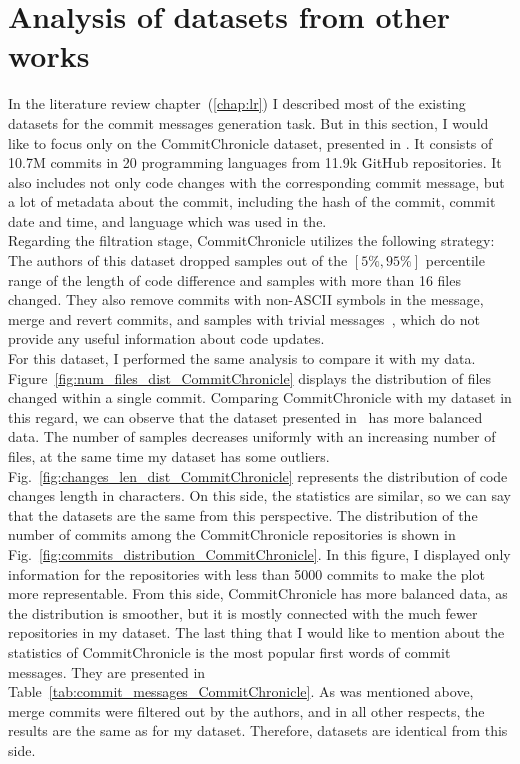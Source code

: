 \section{Analysis of datasets from other works}
In the literature review chapter~(\ref{chap:lr}) I described most of the existing datasets for the commit messages generation task. But in this section, I would like to focus only on the CommitChronicle dataset, presented in {}\cite{eliseeva2023commit}. It consists of 10.7M commits in 20 programming languages from 11.9k GitHub repositories. It also includes not only code changes with the corresponding commit message, but a lot of metadata about the commit, including the hash of the commit, commit date and time, and language which was used in the. \\
Regarding the filtration stage, CommitChronicle utilizes the following strategy: The authors of this dataset dropped samples out of the $[5\%, 95\%]$ percentile range of the length of code difference and samples with more than 16 files changed. They also remove commits with non-ASCII symbols in the message, merge and revert commits, and samples with trivial messages~\cite{liu2018neural}, which do not provide any useful information about code updates. \\
For this dataset, I performed the same analysis to compare it with my data. Figure~{}\ref{fig:num_files_dist_CommitChronicle} displays the distribution of files changed within a single commit. Comparing CommitChronicle with my dataset in this regard, we can observe that the dataset presented in~\cite{eliseeva2023commit} has more balanced data. The number of samples decreases uniformly with an increasing number of files, at the same time my dataset has some outliers. Fig.~{}\ref{fig:changes_len_dist_CommitChronicle} represents the distribution of code changes length in characters. On this side, the statistics are similar, so we can say that the datasets are the same from this perspective. The distribution of the number of commits among the CommitChronicle repositories is shown in Fig.~{}\ref{fig:commits_distribution_CommitChronicle}. In this figure, I displayed only information for the repositories with less than 5000 commits to make the plot more representable. From this side, CommitChronicle has more balanced data, as the distribution is smoother, but it is mostly connected with the much fewer repositories in my dataset. The last thing that I would like to mention about the statistics of CommitChronicle is the most popular first words of commit messages. They are presented in Table~{}\ref{tab:commit_messages_CommitChronicle}. As was mentioned above, merge commits were filtered out by the authors, and in all other respects, the results are the same as for my dataset. Therefore, datasets are identical from this side.


